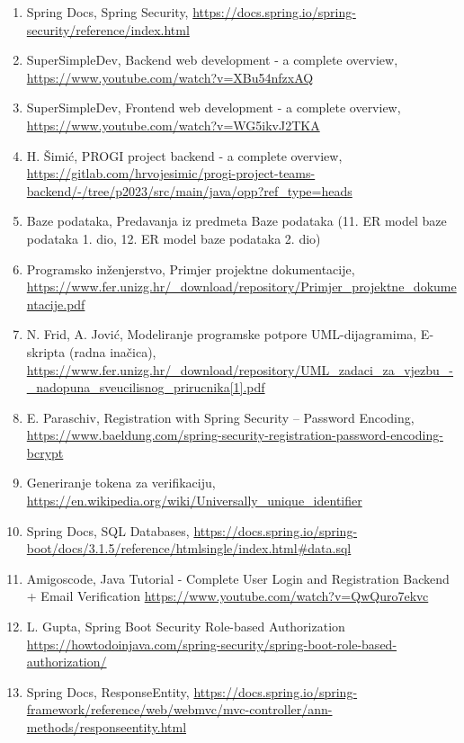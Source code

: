 \begin{enumerate}
			\item Spring Docs, Spring Security, 	\url{https://docs.spring.io/spring-security/reference/index.html}
			
			\item SuperSimpleDev, Backend web development - a complete overview,
			\url{https://www.youtube.com/watch?v=XBu54nfzxAQ}
			
			\item SuperSimpleDev, Frontend web development - a complete overview,
			\url{https://www.youtube.com/watch?v=WG5ikvJ2TKA}
			
			\item H. Šimić, PROGI project backend - a complete overview,
			\url{https://gitlab.com/hrvojesimic/progi-project-teams-backend/-/tree/p2023/src/main/java/opp?ref_type=heads}
			
			\item Baze podataka, Predavanja iz predmeta Baze podataka (11. ER model baze podataka 1. dio, 12. ER model baze podataka 2. dio)
			
			\item Programsko inženjerstvo, Primjer projektne dokumentacije, \url{https://www.fer.unizg.hr/_download/repository/Primjer_projektne_dokumentacije.pdf}
			
			\item N. Frid, A. Jović, Modeliranje programske potpore	UML-dijagramima, E-skripta (radna inačica), \url{https://www.fer.unizg.hr/_download/repository/UML_zadaci_za_vjezbu_-_nadopuna_sveucilisnog_prirucnika[1].pdf}
			
			\item E. Paraschiv, Registration with Spring Security – Password Encoding, \url{https://www.baeldung.com/spring-security-registration-password-encoding-bcrypt}
			
			\item Generiranje tokena za verifikaciju, \url{https://en.wikipedia.org/wiki/Universally_unique_identifier}
			
			\item Spring Docs, SQL Databases, \url{https://docs.spring.io/spring-boot/docs/3.1.5/reference/htmlsingle/index.html#data.sql}
			
			\item Amigoscode, Java Tutorial - Complete User Login and Registration Backend + Email Verification \url{https://www.youtube.com/watch?v=QwQuro7ekvc}
			
			\item L. Gupta, Spring Boot Security Role-based Authorization \url{https://howtodoinjava.com/spring-security/spring-boot-role-based-authorization/}
			
			\item Spring Docs, ResponseEntity,  \url{https://docs.spring.io/spring-framework/reference/web/webmvc/mvc-controller/ann-methods/responseentity.html}
		

			
			
		\end{enumerate}
		
		 